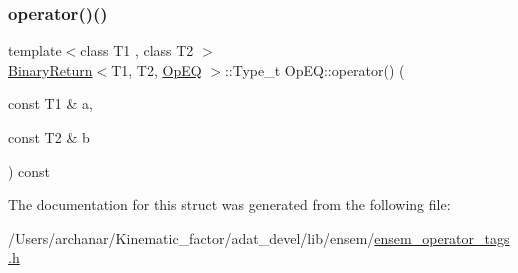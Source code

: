 \mbox{\label{structOpEQ_aadd4c1f0508ded0e1ad084d0a724f912}} 
\subsubsection{\texorpdfstring{operator()()}{operator()()}\hspace{0.1cm}{\footnotesize\ttfamily [2/2]}}
{\footnotesize\ttfamily template$<$class T1 , class T2 $>$ \\
\mbox{\hyperlink{structBinaryReturn}{Binary\+Return}}$<$T1, T2, \mbox{\hyperlink{structOpEQ}{Op\+EQ}} $>$\+::Type\+\_\+t Op\+E\+Q\+::operator() (\begin{DoxyParamCaption}\item[{const T1 \&}]{a,  }\item[{const T2 \&}]{b }\end{DoxyParamCaption}) const\hspace{0.3cm}{\ttfamily [inline]}}



The documentation for this struct was generated from the following file\+:\begin{DoxyCompactItemize}
\item 
/\+Users/archanar/\+Kinematic\+\_\+factor/adat\+\_\+devel/lib/ensem/\mbox{\hyperlink{lib_2ensem_2ensem__operator__tags_8h}{ensem\+\_\+operator\+\_\+tags.\+h}}\end{DoxyCompactItemize}
